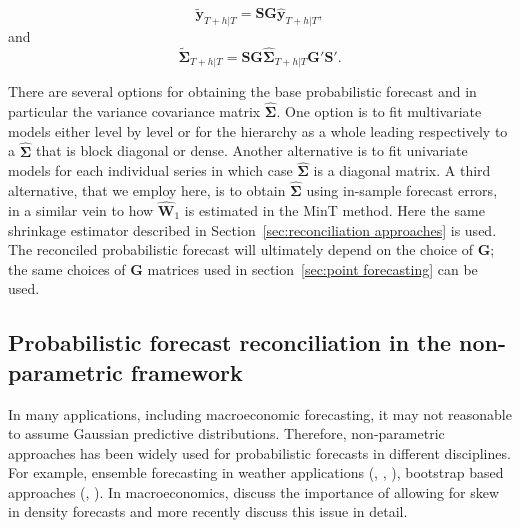 \documentclass[graybox]{svmult}
\begin{document}
\begin{equation}\label{eq:rec mean}
\bm{\tilde{y}}_{T+h|T} = \bm{SG}\bm{\hat{y}}_{T+h|T},
\end{equation}
and
\begin{equation}\label{eq:rec var}
\tilde{\bm{\Sigma}}_{T+h|T} = \bm{SG}\hat{\bm{\Sigma}}_{T+h|T}\bm{G'S'}.
\end{equation}

There are several options for obtaining the base probabilistic forecast and in particular the variance covariance matrix $\hat{\bm{\Sigma}}$.  One option is to fit multivariate models either level by level or for the hierarchy as a whole leading respectively to a $\hat{\bm \Sigma}$ that is block diagonal or dense.  Another alternative is to fit univariate models for each individual series in which case $\hat{\bm{\Sigma}}$ is a diagonal matrix. A third alternative, that we employ here, is to obtain $\hat{\bm{\Sigma}}$ using in-sample forecast errors, in a similar vein to how $\hat{\bm{W}}_{1}$ is estimated in the MinT method.  Here the same shrinkage estimator described in Section~\ref{sec:reconciliation approaches} is used.  The reconciled probabilistic forecast will ultimately depend on the choice of $\bm{G}$; the same choices of $\bm{G}$ matrices used in section~\ref{sec:point forecasting} can be used.

\subsection{Probabilistic forecast reconciliation in the non-parametric framework}\label{sec:probrecnp}

In many applications, including macroeconomic forecasting, it may not reasonable to assume Gaussian predictive distributions. Therefore, non-parametric approaches has been widely used for probabilistic forecasts in different disciplines. For example, ensemble forecasting in weather applications (\cite{GneRaf2005}, \cite{Gneiting2014}, \cite{Gneiting2008}), bootstrap based approaches (\cite{Manzan2008}, \cite{Vilar2013}). In macroeconomics, \cite{CogEtAl2005} discuss the importance of allowing for skew in density forecasts and more recently \cite{SmiVah2016} discuss this issue in detail.
\end{document}
